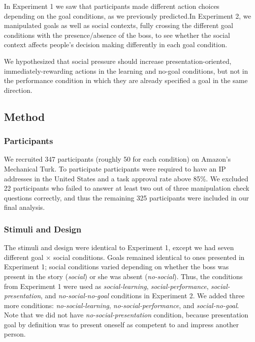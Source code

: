 \documentclass[10pt, letterpaper]{article}
\begin{document}
In Experiment 1 we saw that participants made different action choices
depending on the goal conditions, as we previously predicted.In
Experiment 2, we manipulated goals as well as social contexts, fully
crossing the different goal conditions with the presence/absence of the
boss, to see whether the social context affects people's decision making
differently in each goal condition.

We hypothesized that social pressure should increase
presentation-oriented, immediately-rewarding actions in the learning and
no-goal conditions, but not in the performance condition in which they
are already specified a goal in the same direction.

\subsection{Method}\label{method-1}

\subsubsection{Participants}\label{participants-1}

We recruited 347 participants (roughly 50 for each condition) on
Amazon's Mechanical Turk. To participate participants were required to
have an IP addresses in the United States and a task approval rate above
85\%. We excluded 22 participants who failed to answer at least two out
of three manipulation check questions correctly, and thus the remaining
325 participants were included in our final analysis.

\subsubsection{Stimuli and Design}\label{stimuli-and-design-1}

The stimuli and design were identical to Experiment 1, except we had
seven different goal \(\times\) social conditions. Goals remained
identical to ones presented in Experiment 1; social conditions varied
depending on whether the boss was present in the story (\emph{social})
or she was absent (\emph{no-social}). Thus, the conditions from
Experiment 1 were used as \emph{social-learning},
\emph{social-performance}, \emph{social-presentation}, and
\emph{no-social-no-goal} conditions in Experiment 2. We added three more
conditions: \emph{no-social-learning}, \emph{no-social-performance}, and
\emph{social-no-goal}. Note that we did not have
\emph{no-social-presentation} condition, because presentation goal by
definition was to present oneself as competent to and impress another
person.
\end{document}
